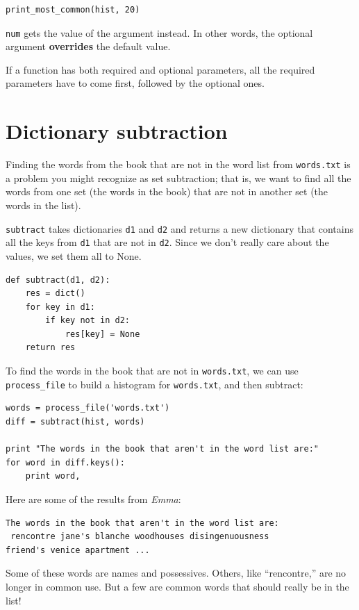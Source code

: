 \beforeverb
\begin{verbatim}
print_most_common(hist, 20)
\end{verbatim}
\afterverb

{\tt num} gets the value of the argument instead.  In other
words, the optional argument {\bf overrides} the default value.


If a function has both required and optional parameters, all
the required parameters have to come first, followed by the
optional ones.


\section{Dictionary subtraction}


Finding the words from the book that are not in the word list
from {\tt words.txt} is a problem you might recognize as set
subtraction; that is, we want to find all the words from one
set (the words in the book) that are not in another set (the
words in the list).

{\tt subtract} takes dictionaries {\tt d1} and {\tt d2} and returns a
new dictionary that contains all the keys from {\tt d1} that are not
in {\tt d2}.  Since we don't really care about the values, we
set them all to None.

\beforeverb
\begin{verbatim}
def subtract(d1, d2):
    res = dict()
    for key in d1:
        if key not in d2:
            res[key] = None
    return res
\end{verbatim}
\afterverb
%
To find the words in the book that are not in {\tt words.txt},
we can use \verb"process_file" to build a histogram for
{\tt words.txt}, and then subtract:

\beforeverb
\begin{verbatim}
words = process_file('words.txt')
diff = subtract(hist, words)

print "The words in the book that aren't in the word list are:"
for word in diff.keys():
    print word,
\end{verbatim}
\afterverb
%
Here are some of the results from {\em Emma}:

\beforeverb
\begin{verbatim}
The words in the book that aren't in the word list are:
 rencontre jane's blanche woodhouses disingenuousness 
friend's venice apartment ...
\end{verbatim}
\afterverb
%
Some of these words are names and possessives.  Others, like
``rencontre,'' are no longer in common use.  But a few are common
words that should really be in the list!

